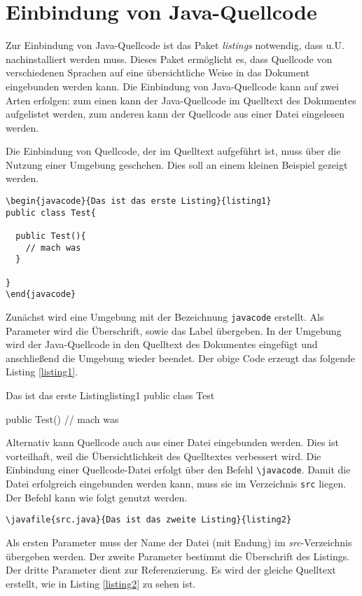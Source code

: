 %
\section{Einbindung von Java-Quellcode}
%
Zur Einbindung von Java-Quellcode ist das Paket \emph{listings} notwendig, dass
u.U. nachinstalliert werden muss. Dieses Paket ermöglicht es, dass Quellcode von
verschiedenen Sprachen auf eine übersichtliche Weise in das Dokument eingebunden
werden kann. Die Einbindung von Java-Quellcode kann auf zwei Arten erfolgen: zum
einen kann der Java-Quellcode im Quelltext des Dokumentes aufgelistet werden,
zum anderen kann der Quellcode aus einer Datei eingelesen werden.

Die Einbindung von Quellcode, der im Quelltext aufgeführt ist, muss über die
Nutzung einer Umgebung geschehen. Dies soll an einem kleinen Beispiel gezeigt
werden.
\begin{verbatim}
\begin{javacode}{Das ist das erste Listing}{listing1}
public class Test{

  public Test(){
    // mach was
  }

}
\end{javacode}
\end{verbatim}
%
Zunächst wird eine Umgebung mit der Bezeichnung \texttt{javacode}
erstellt. Als Parameter wird die Überschrift, sowie das Label übergeben. 
In der Umgebung wird der Java-Quellcode in den Quelltext des Dokumentes eingefügt und anschließend
die Umgebung wieder beendet. Der obige Code erzeugt das folgende Listing
\ref{listing1}.

\begin{javacode}{Das ist das erste Listing}{listing1}
public class Test {

  public Test(){
    // mach was
  }

}
\end{javacode}

Alternativ kann Quellcode auch aus einer Datei eingebunden werden. Dies ist
vorteilhaft, weil die Übersichtlichkeit des Quelltextes verbessert wird. Die
Einbindung einer Quellcode-Datei erfolgt über den Befehl
\texttt{\textbackslash javacode}. Damit die Datei erfolgreich eingebunden werden kann, muss
sie im Verzeichnis \texttt{src} liegen. Der Befehl kann wie folgt genutzt werden.
\begin{verbatim}
\javafile{src.java}{Das ist das zweite Listing}{listing2}
\end{verbatim}

Als ersten Parameter muss der Name der Datei (mit Endung) im
\emph{src}-Verzeichnis übergeben werden. Der zweite Parameter bestimmt die
Überschrift des Listings. Der dritte Parameter dient zur Referenzierung. Es wird
der gleiche Quelltext erstellt, wie in Listing \ref{listing2} zu sehen ist.


